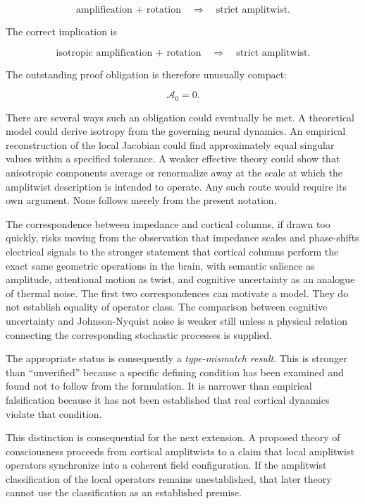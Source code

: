 \documentclass[11pt]{article}
\begin{document}
\begin{equation}
\text{amplification + rotation}
\quad\Longrightarrow\quad
\text{strict amplitwist}.
\end{equation}

The correct implication is

\begin{equation}
\text{isotropic amplification + rotation}
\quad\Longrightarrow\quad
\text{strict amplitwist}.
\end{equation}

The outstanding proof obligation is therefore unusually compact:

\begin{equation}
\boxed{
\mathcal A_0=0.
}
\end{equation}

There are several ways such an obligation could eventually be met. A theoretical model could derive isotropy from the governing neural dynamics. An empirical reconstruction of the local Jacobian could find approximately equal singular values within a specified tolerance. A weaker effective theory could show that anisotropic components average or renormalize away at the scale at which the amplitwist description is intended to operate. Any such route would require its own argument. None follows merely from the present notation.

The correspondence between impedance and cortical columns, if drawn too quickly, risks moving from the observation that impedance scales and phase-shifts electrical signals to the stronger statement that cortical columns perform the exact same geometric operations in the brain, with semantic salience as amplitude, attentional motion as twist, and cognitive uncertainty as an analogue of thermal noise. The first two correspondences can motivate a model. They do not establish equality of operator class. The comparison between cognitive uncertainty and Johnson-Nyquist noise is weaker still unless a physical relation connecting the corresponding stochastic processes is supplied.

The appropriate status is consequently a \emph{type-mismatch result}. This is stronger than ``unverified'' because a specific defining condition has been examined and found not to follow from the formulation. It is narrower than empirical falsification because it has not been established that real cortical dynamics violate that condition.

This distinction is consequential for the next extension. A proposed theory of consciousness proceeds from cortical amplitwists to a claim that local amplitwist operators synchronize into a coherent field configuration. If the amplitwist classification of the local operators remains unestablished, that later theory cannot use the classification as an established premise.
\end{document}
